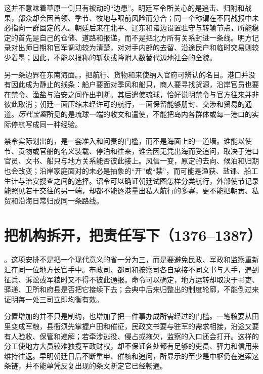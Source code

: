 这并不意味着草原一侧只有被动的“边患”。明廷军令所关心的是追击、归附和战果，部众却会因首领、季节、牧地与眼前风险而分合；同一个称谓在不同战报中未必指向一群固定的人。朝廷后来在北平、辽东和诸边设置驻守与转输节点，所能稳定的首先是自己的仓储、道路和报递，而不是把北方所有关系封进一条线。明方记录对出师日期和官军调动较为清楚，对对手内部的去留、沿途民户和临时交易则较少着墨；因此，不能以报称的斩获或降附人数替代边地社会的全貌。

另一条边界在东南海面。，把航行、货物和来使纳入官府可辨认的名目。港口并没有因此成为静止的线条：船户要面对季风和船只，商人要寻找货源，沿岸官员也要在禁令、渔盐与治安之间作出判断。其后遣使琉球，恰好说明禁令与官方往来并非彼此取消；朝廷一面压缩未经许可的航行，一面保留能够册封、交涉和贸易的通道。\textit{历代宝案}所见的是琉球一端的收文和遣使，不能把岛内各群体或每一港口的实际停航写成同一种经验。

禁令实际划出的，是一套准入和问责的门槛，而不是海面上的一道墙。谁能以使节、贡物或官船的名义装载、停泊和往来，谁会因无凭出海而受追问，取决于港口官员、文书、船只与地方关系能否彼此接上。风信一变，原定的去向、候泊和归期也会改变；沿岸家庭面对的未必是抽象的“开”或“禁”，而可能是渔获、盐课、船工生计与治安搜查之间的选择。诏令可以确证朝廷试图怎样分类航行，外部使节记录能照见若干交往的另一端，却都不能逐港量出私人航行的多寡，更不能把朝贡、私贸和沿海日常归成同一条路线。

\section{把机构拆开，把责任写下（1376--1387）}

。这项安排不是把一个现代意义的省一分为三，而是要避免民政、军政和监察重新汇在同一位地方长官手中。布政司、都司和按察司各自承接不同文书与人手，遇到征兵、诉讼或军粮时又不得不彼此通报。命令可以确定，地方运转却取决于书吏、驿递、卫所和府县是否把它接续下去；会典中后来归整出的制度轮廓，不能倒过来证明每一处三司立即均衡有效。

分置增加的并不只是制约，也增加了把一件事办成所需经过的门槛。一笔粮要从田里变成军粮，县衙须先掌握户田和催征，民政文书要与驻军的需求相接，沿途又要有人验收、保管和递解；若牵涉逃役、侵占或拖欠，监察的入口还会打开。这样的分工使地方大员较难独揽军政财权，却不保证各处都有足够的吏员、驿力和信用来维持往返。早明朝廷日后不断重申、催核和追问，所显示的至少是中枢仍在追索这条链，并不能单凭反复出现的条文断定它已经畅通。

